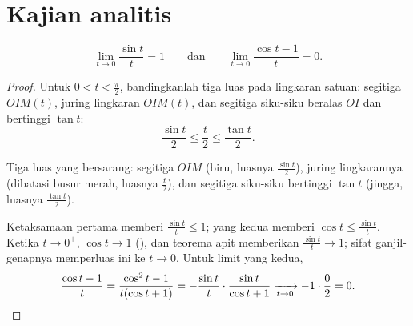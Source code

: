 \section{Kajian analitis}

\begin{lemma}\label{lem:g12:trigo:sinxx}
\[
\lim_{t \to 0} \frac{\sin t}{t} = 1
\qquad\text{dan}\qquad
\lim_{t \to 0} \frac{\cos t - 1}{t} = 0 .
\]
\end{lemma}

\begin{proof}
Untuk $0 < t < \frac{\pi}{2}$, bandingkanlah tiga luas pada lingkaran satuan:
segitiga $OIM(t)$, juring lingkaran $OIM(t)$, dan segitiga siku-siku
beralas $OI$ dan bertinggi $\tan t$:
\[
\frac{\sin t}{2} \leq \frac{t}{2} \leq \frac{\tan t}{2}.
\]

\begin{omfigure}

{\small Tiga luas yang bersarang: segitiga $OIM$ (biru, luasnya
$\frac{\sin t}{2}$), juring lingkarannya (dibatasi busur merah, luasnya
$\frac{t}{2}$), dan segitiga siku-siku bertinggi $\tan t$ (jingga, luasnya
$\frac{\tan t}{2}$).}
\end{omfigure}

Ketaksamaan pertama memberi $\frac{\sin t}{t} \leq 1$; yang kedua memberi
$\cos t \leq \frac{\sin t}{t}$. Ketika $t \to 0^+$, $\cos t \to 1$
(), dan teorema apit memberikan $\frac{\sin t}{t} \to 1$; sifat
ganjil-genapnya memperluas ini ke $t \to 0$. Untuk limit yang kedua,
\[
\frac{\cos t - 1}{t} = \frac{\cos^2 t - 1}{t(\cos t + 1)}
= -\frac{\sin t}{t}\cdot\frac{\sin t}{\cos t + 1}
\xrightarrow[t\to0]{} -1 \cdot \frac{0}{2} = 0. \qedhere
\]
\end{proof}

